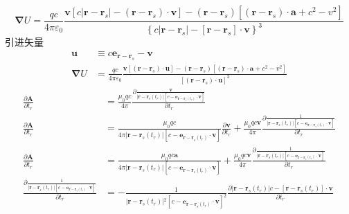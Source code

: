 \begin{equation}
    \boldsymbol{\nabla}U=\frac{qc}{4\pi\varepsilon_0} \frac{\boldsymbol{v}\left[c|\boldsymbol{r}-\boldsymbol{r}_s|-(\boldsymbol{r}-\boldsymbol{r}_s)\cdot\boldsymbol{v}\right]
    -(\boldsymbol{r}-\boldsymbol{r}_s)[(\boldsymbol{r}-\boldsymbol{r}_s) \cdot \boldsymbol{a}+c^2- v^2]}{\left\{c|\boldsymbol{r} - \boldsymbol{r}_s|-[\boldsymbol{r}-\boldsymbol{r}_s]\cdot\boldsymbol{v}\right\}^3}
\end{equation}
引进矢量
\begin{align}
    \boldsymbol{u}&\equiv c\boldsymbol{e}_{\boldsymbol{r}-\boldsymbol{r}_s}-\boldsymbol{v}\\
    \boldsymbol{\nabla}U&=\frac{qc}{4\pi\varepsilon_0} \frac{\boldsymbol{v}\left[(\boldsymbol{r}-\boldsymbol{r}_s)\cdot\boldsymbol{u}\right]
    -(\boldsymbol{r}-\boldsymbol{r}_s)[(\boldsymbol{r}-\boldsymbol{r}_s) \cdot \boldsymbol{a}+c^2- v^2]}{\left[(\boldsymbol{r}-\boldsymbol{r}_s)\cdot\boldsymbol{u}\right]^3}
\end{align}
\begin{align*}
    \frac{\partial\boldsymbol{A}}{\partial t_r}&=\frac{\mu_0qc}{4\pi}\frac{\partial \frac{\boldsymbol{v}}{\vert{}\boldsymbol{r} - \boldsymbol{r}_s(t_r)\vert{}\left[c-\boldsymbol{e}_{\boldsymbol{r} -\boldsymbol{r}_s(t_r)}\cdot\boldsymbol{v}\right]}}{\partial t_r}\\
    \frac{\partial\boldsymbol{A}}{\partial t_r}&=\frac{\mu_0qc}{4\pi\vert{}\boldsymbol{r} - \boldsymbol{r}_s(t_r)\vert{}\left[c-\boldsymbol{e}_{\boldsymbol{r} -\boldsymbol{r}_s(t_r)}\cdot\boldsymbol{v}\right]}\frac{\partial \boldsymbol{v}}{\partial t_r}
    +\frac{\mu_0qc\boldsymbol{v}}{4\pi}\frac{\partial \frac{1}{\vert{}\boldsymbol{r} - \boldsymbol{r}_s(t_r)\vert{}\left[c-\boldsymbol{e}_{\boldsymbol{r} -\boldsymbol{r}_s(t_r)}\cdot\boldsymbol{v}\right]}}{\partial t_r}\\
    \frac{\partial\boldsymbol{A}}{\partial t_r}&=\frac{\mu_0qc\boldsymbol{a}}{4\pi\vert{}\boldsymbol{r} - \boldsymbol{r}_s(t_r)\vert{}\left[c-\boldsymbol{e}_{\boldsymbol{r} -\boldsymbol{r}_s(t_r)}\cdot\boldsymbol{v}\right]}
    +\frac{\mu_0qc\boldsymbol{v}}{4\pi}\frac{\partial \frac{1}{\vert{}\boldsymbol{r} - \boldsymbol{r}_s(t_r)\vert{}\left[c-\boldsymbol{e}_{\boldsymbol{r} -\boldsymbol{r}_s(t_r)}\cdot\boldsymbol{v}\right]}}{\partial t_r}\\
    \frac{\partial \frac{1}{\vert{}\boldsymbol{r} - \boldsymbol{r}_s(t_r)\vert{}\left[c-\boldsymbol{e}_{\boldsymbol{r} -\boldsymbol{r}_s(t_r)}\cdot\boldsymbol{v}\right]}}{\partial t_r}&=
    -\frac{1}{\vert{}\boldsymbol{r} - \boldsymbol{r}_s(t_r)\vert{}^2\left[c-\boldsymbol{e}_{\boldsymbol{r} -\boldsymbol{r}_s(t_r)}\cdot\boldsymbol{v}\right]^2}\frac{\partial \vert{}\boldsymbol{r} - \boldsymbol{r}_s(t_r)\vert{}c-\left[\boldsymbol{r} - \boldsymbol{r}_s(t_r)\right]\cdot\boldsymbol{v}}{\partial t_r}
\end{align*}
